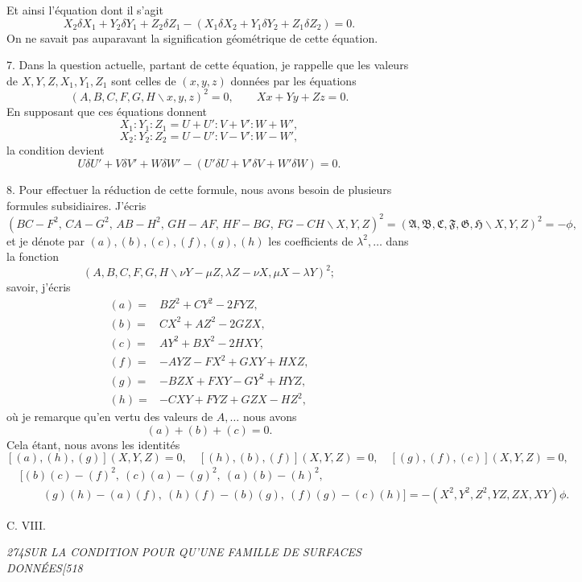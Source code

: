 \documentclass[11pt]{article}
\newcommand{\phead}[3]{\noindent\textit{#1\hfill #2\hfill #3}\par\medskip}
\newcommand{\qform}[2]{(#1\backslash #2)^2}
\newcommand{\D}{\delta}
\newcommand{\frA}{\mathfrak A}
\newcommand{\frB}{\mathfrak B}
\newcommand{\frC}{\mathfrak C}
\newcommand{\frF}{\mathfrak F}
\newcommand{\frG}{\mathfrak G}
\newcommand{\frH}{\mathfrak H}
\begin{document}
Et ainsi l'\'equation dont il s'agit
\[
X_2\D X_1+Y_2\D Y_1+Z_2\D Z_1-(X_1\D X_2+Y_1\D Y_2+Z_1\D Z_2)=0.
\]
On ne savait pas auparavant la signification g\'eom\'etrique de cette \'equation.

7. Dans la question actuelle, partant de cette \'equation, je rappelle que les valeurs
de $X,Y,Z,X_1,Y_1,Z_1$ sont celles de $(x,y,z)$ donn\'ees par les \'equations
\[
\qform{A,B,C,F,G,H}{x,y,z}=0,\qquad Xx+Yy+Zz=0.
\]
En supposant que ces \'equations donnent
\[
X_1:Y_1:Z_1=U+U':V+V':W+W',
\]
\[
X_2:Y_2:Z_2=U-U':V-V':W-W',
\]
la condition devient
\[
U\D U'+V\D V'+W\D W'-(U'\D U+V'\D V+W'\D W)=0.
\]

8. Pour effectuer la r\'eduction de cette formule, nous avons besoin de plusieurs
formules subsidiaires. J'\'ecris
\[
\qform{BC-F^2,\,CA-G^2,\,AB-H^2,\,GH-AF,\,HF-BG,\,FG-CH}{X,Y,Z}
=\qform{\frA,\frB,\frC,\frF,\frG,\frH}{X,Y,Z}=-\phi,
\]
et je d\'enote par $(a),(b),(c),(f),(g),(h)$ les coefficients de $\lambda^2,\ldots$ dans la
fonction
\[
\qform{A,B,C,F,G,H}{\nu Y-\mu Z,\lambda Z-\nu X,\mu X-\lambda Y};
\]
savoir, j'\'ecris
\[
\begin{array}{rl}
(a)=&BZ^2+CY^2-2FYZ,\\
(b)=&CX^2+AZ^2-2GZX,\\
(c)=&AY^2+BX^2-2HXY,\\
(f)=&-AYZ-FX^2+GXY+HXZ,\\
(g)=&-BZX+FXY-GY^2+HYZ,\\
(h)=&-CXY+FYZ+GZX-HZ^2,
\end{array}
\]
o\`u je remarque qu'en vertu des valeurs de $A,\ldots$ nous avons
\[
(a)+(b)+(c)=0.
\]
Cela \'etant, nous avons les identit\'es
\[
[(a),(h),(g)](X,Y,Z)=0,\quad
[(h),(b),(f)](X,Y,Z)=0,\quad
[(g),(f),(c)](X,Y,Z)=0,
\]
\[
\begin{split}
&[(b)(c)-(f)^2,\ (c)(a)-(g)^2,\ (a)(b)-(h)^2,\\
&\qquad (g)(h)-(a)(f),\ (h)(f)-(b)(g),\ (f)(g)-(c)(h)]
=-(X^2,Y^2,Z^2,YZ,ZX,XY)\phi.
\end{split}
\]

\hfill C. VIII.
\clearpage

\phead{274}{SUR LA CONDITION POUR QU'UNE FAMILLE DE SURFACES DONN\'EES}{[518}
\end{document}
